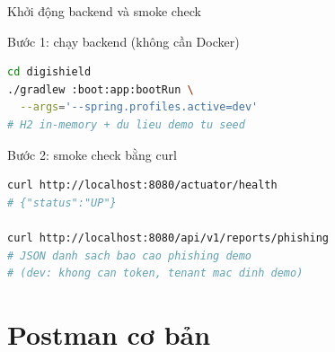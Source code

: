 \documentclass[aspectratio=169,12pt]{beamer}
\begin{document}
\begin{frame}[fragile]{Khởi động backend và smoke check}
  \begin{block}{Bước 1: chạy backend (không cần Docker)}
\begin{lstlisting}[language=bash]
cd digishield
./gradlew :boot:app:bootRun \
  --args='--spring.profiles.active=dev'
# H2 in-memory + du lieu demo tu seed
\end{lstlisting}
  \end{block}

  \begin{block}{Bước 2: smoke check bằng curl}
\begin{lstlisting}[language=bash]
curl http://localhost:8080/actuator/health
# {"status":"UP"}

curl http://localhost:8080/api/v1/reports/phishing
# JSON danh sach bao cao phishing demo
# (dev: khong can token, tenant mac dinh demo)
\end{lstlisting}
  \end{block}
\end{frame}

\section{Postman cơ bản}
\end{document}
